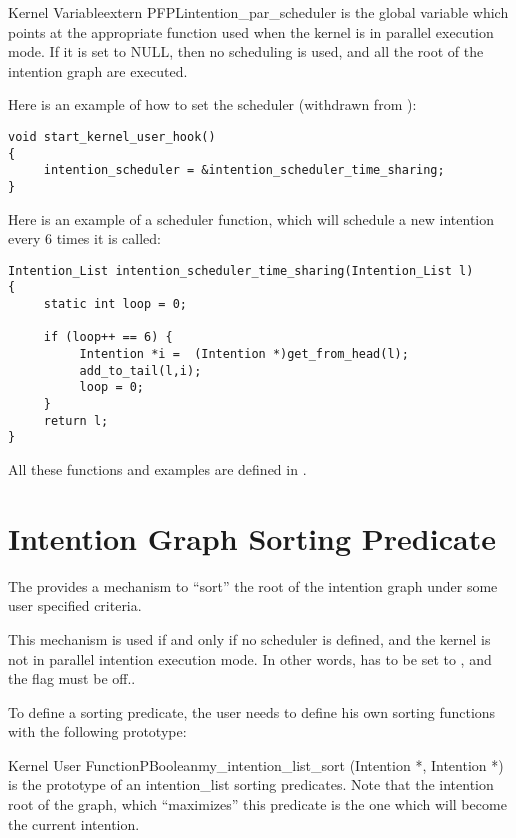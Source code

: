 \begin{typevr}{Kernel Variable}{extern PFPL}{intention\_par\_scheduler}
is the global variable which points at the appropriate function used when the
kernel is in parallel execution mode. If it is set to NULL, then no scheduling
is used, and all the root of the intention graph are executed.
\end{typevr}

Here is an example of how to set the scheduler (withdrawn
from ):

\begin{verbatim}
void start_kernel_user_hook()
{
     intention_scheduler = &intention_scheduler_time_sharing;
}
\end{verbatim}

Here is an example of a scheduler function, which will schedule a new intention
every 6 times it is called:

\begin{verbatim}
Intention_List intention_scheduler_time_sharing(Intention_List l)
{
     static int loop = 0;

     if (loop++ == 6) {
          Intention *i =  (Intention *)get_from_head(l);
          add_to_tail(l,i);
          loop = 0;
     }
     return l;
}
\end{verbatim}

All these functions and examples are defined in .

\section{Intention Graph Sorting Predicate}

The \CPK{} provides a mechanism to ``sort'' the root of the
intention graph under some user specified criteria.

This mechanism is used if and only if no scheduler is defined, and the kernel
is not in parallel intention execution mode. In other words,
 has to be set to , and the  flag must be off..

To define a sorting predicate, the user
needs to define his own sorting functions with the following
prototype:

\begin{typefn}{Kernel User Function}{PBoolean}{my\_intention\_list\_sort} {(Intention *, Intention *)}
is the prototype of an intention\_list sorting predicates. Note that the
intention root of the graph, which ``maximizes'' this predicate is the one
which will become the current intention.
\end{typefn}

